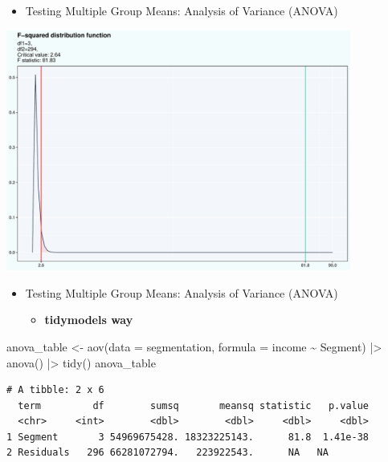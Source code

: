 \documentclass[
  ignorenonframetext,
]{beamer}
\newenvironment{Shaded}{\begin{snugshade}}{\end{snugshade}}
\newcommand{\AttributeTok}[1]{\textcolor[rgb]{0.40,0.45,0.13}{#1}}
\newcommand{\FunctionTok}[1]{\textcolor[rgb]{0.28,0.35,0.67}{#1}}
\newcommand{\NormalTok}[1]{\textcolor[rgb]{0.00,0.23,0.31}{#1}}
\newcommand{\OtherTok}[1]{\textcolor[rgb]{0.00,0.23,0.31}{#1}}
\newcommand{\SpecialCharTok}[1]{\textcolor[rgb]{0.37,0.37,0.37}{#1}}
\providecommand{\tightlist}{%
  \setlength{\itemsep}{0pt}\setlength{\parskip}{0pt}}\usepackage{longtable,booktabs,array}
\begin{document}
\begin{frame}{}
\label{section-26}
\begin{itemize}
\tightlist
\item
  Testing Multiple Group Means: Analysis of Variance (ANOVA)
\end{itemize}

\begin{center}
\includegraphics[width=0.85\textwidth,height=\textheight]{006_comparing_groups_statistical_tests_files/figure-beamer/unnamed-chunk-23-1.pdf}
\end{center}
\end{frame}

\begin{frame}[fragile]{}
\label{section-27}
\begin{itemize}
\item
  Testing Multiple Group Means: Analysis of Variance (ANOVA)

  \begin{itemize}
  \tightlist
  \item
    \textbf{tidymodels way}
  \end{itemize}
\end{itemize}

\tiny

\begin{Shaded}
\begin{Highlighting}[]
\NormalTok{anova\_table }\OtherTok{\textless{}{-}} \FunctionTok{aov}\NormalTok{(}\AttributeTok{data =}\NormalTok{ segmentation, }\AttributeTok{formula =}\NormalTok{ income }\SpecialCharTok{\textasciitilde{}}\NormalTok{ Segment) }\SpecialCharTok{|\textgreater{}}
  \FunctionTok{anova}\NormalTok{() }\SpecialCharTok{|\textgreater{}} 
  \FunctionTok{tidy}\NormalTok{()}
\NormalTok{anova\_table}
\end{Highlighting}
\end{Shaded}

\begin{verbatim}
# A tibble: 2 x 6
  term         df        sumsq       meansq statistic   p.value
  <chr>     <int>        <dbl>        <dbl>     <dbl>     <dbl>
1 Segment       3 54969675428. 18323225143.      81.8  1.41e-38
2 Residuals   296 66281072794.   223922543.      NA   NA       
\end{verbatim}
\end{frame}
\end{document}
